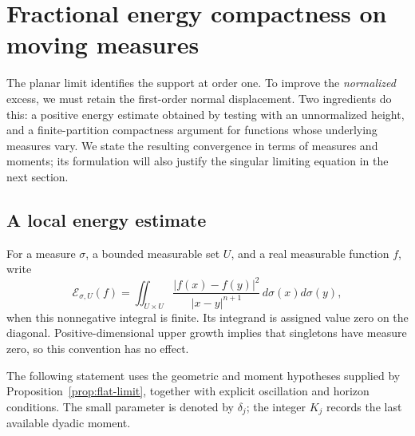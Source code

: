 \section{Fractional energy compactness on moving measures}
\label{sec:height-compactness}

The planar limit identifies the support at order one.  To improve the
\emph{normalized} excess, we must retain the first-order normal displacement.
Two ingredients do this: a positive energy estimate obtained by testing with
an unnormalized height, and a finite-partition compactness argument for
functions whose underlying measures vary.  We state the resulting convergence
in terms of measures and moments; its formulation will also justify the
singular limiting equation in the next section.

\subsection{A local energy estimate}

For a measure $\sigma$, a bounded measurable set $U$, and a real measurable
function $f$, write
\begin{equation}
 \mathcal E_{\sigma,U}(f)
 =\iint_{U\times U}
       \frac{|f(x)-f(y)|^2}{|x-y|^{n+1}}\,d\sigma(x)d\sigma(y),
 \label{eq:height-energy-definition}
\end{equation}
when this nonnegative integral is finite.  Its integrand is assigned value
zero on the diagonal.  Positive-dimensional upper growth implies that
singletons have measure zero, so this convention has no effect.

The following statement uses the geometric and moment hypotheses supplied
by Proposition~\ref{prop:flat-limit}, together with explicit oscillation
and horizon conditions.  The small parameter is denoted by
$\delta_j$; the integer $K_j$ records the last available dyadic moment.

